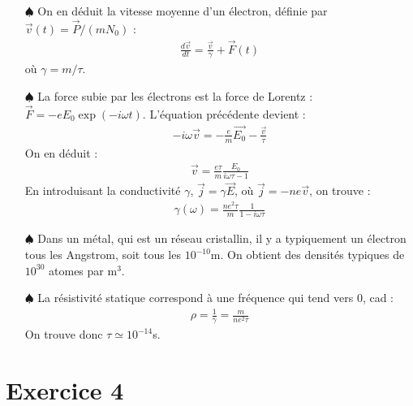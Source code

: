\documentclass{report}
\begin{document}
\begin{itemize}
	\item[$\spadesuit$] On en déduit la vitesse moyenne d'un électron, définie par $\vec{v}(t)=\vec{P}/(mN_0)$ :
	\begin{align*}
		\frac{d\vec{v}}{dt}=\frac{\vec{v}}{\gamma}+\vec{F}(t)
	\end{align*}
	où $\gamma=m/\tau$.
	
	\item[$\spadesuit$] La force subie par les électrons est la force de Lorentz : $\vec{F}=-eE_0\exp(-i\omega t)$. L'équation précédente devient :
	\begin{align*}
		-i\omega\vec{v}=-\frac{e}{m}\vec{E_0}-\frac{\vec{v}}{\tau}
	\end{align*}
	On en déduit :
	\begin{align*}
		\vec{v}=\frac{e\tau}{m}\frac{E_0}{i\omega\tau-1}
	\end{align*}
	En introduisant la conductivité $\gamma$, $\vec{j}=\gamma \vec{E}$, où $\vec{j}=-ne\vec{v}$, on trouve :
	\begin{align*}
		\gamma(\omega)=\frac{ne^2\tau}{m}\frac{1}{1-i\omega\tau}
	\end{align*}
	
	\item[$\spadesuit$] Dans un métal, qui est un réseau cristallin, il y a typiquement un électron tous les Angstrom, soit tous les $10^{-10}$m. On obtient des densités typiques de $10^{30}$ atomes par m$^3$.
	
	\item[$\spadesuit$] La résistivité statique correspond à une fréquence qui tend vers 0, cad :
	\begin{align*}
		\rho = \frac{1}{\gamma}=\frac{m}{ne^2\tau}
	\end{align*}
	On trouve donc $\tau\simeq10^{-14}$s.
	
\end{itemize}

\section*{Exercice 4}
\end{document}
